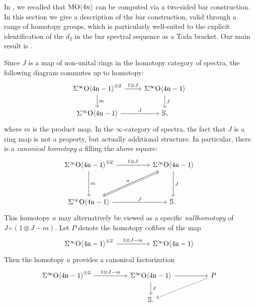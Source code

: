 In , we recalled that $\operatorname{\mathrm{MO}} \langle 4n \rangle$ can be computed via a two-sided bar construction.  In this section we give a description of the bar construction, valid through a range of homotopy groups, which is particularly well-suited to the explicit identification of the $d_2$ in the bar spectral sequence as a Toda bracket.  Our main result is .

\begin{cnstr} \label{cnstr:square}
Since $J$ is a map of non-unital rings in the homotopy category of spectra, the following diagram commutes up to homotopy:
$$
\begin{tikzcd}
\sOf^{\otimes 2} \arrow{r}{1 \otimes J} \arrow{d}{m} & \sOf \arrow{d}{J} \\
\sOf \arrow{r}{J} & \mathbb{S},
\end{tikzcd}
$$
where $m$ is the product map.
In the $\infty$-category of spectra, the fact that $J$ is a ring map is not a property, but actually additional structure.
In particular, there is a \emph{canonical homotopy} $a$ filling the above square:
$$
\begin{tikzcd}[column sep = huge]
\sOf^{\otimes 2} \arrow{dd}{m} \arrow{r}{1 \otimes J} & \sOf \arrow{dd}{J} \\ \\
\sOf \arrow{r}{J} \arrow[Leftrightarrow]{ruu}{a} & \bS.
\end{tikzcd}
$$
This homotopy $a$ may alternatively be viewed as a specific \emph{nullhomotopy} of $J \circ (1 \otimes J-m)$.
Let $P$ denote the homotopy cofiber of the map
$$
\begin{tikzcd}[column sep=huge]
\sOf^{\otimes 2} \arrow{r}{1 \otimes J-m} & \sOf
\end{tikzcd}
$$
Then the homotopy $a$ provides a canonical factorization
$$
\begin{tikzcd}[column sep=huge]
\sOf^{\otimes 2} \arrow{r}{1 \otimes J-m} & \sOf \arrow{d}{J} \arrow{r} & P \arrow[dashed]{dl} \\
& \mathbb{S}.
\end{tikzcd}
$$
\end{cnstr}

